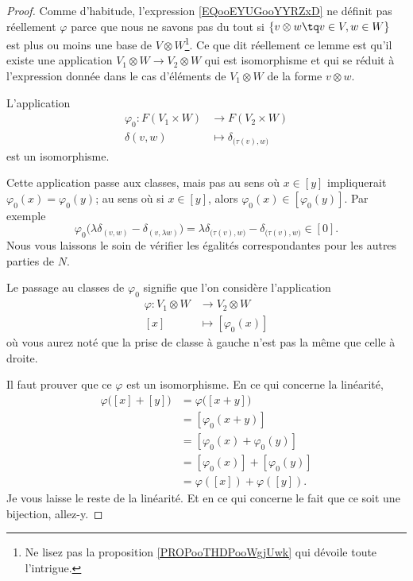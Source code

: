 \begin{proof}
    Comme d'habitude, l'expression \eqref{EQooEYUGooYYRZxD} ne définit pas réellement \( \varphi\) parce que nous ne savons pas du tout si \( \{v\otimes w\tq v\in V,w\in W\}\) est plus ou moins une base de \( V\otimes W\)\footnote{Ne lisez pas la proposition \ref{PROPooTHDPooWgjUwk} qui dévoile toute l'intrigue.}. Ce que dit réellement ce lemme est qu'il existe une application \( V_1\otimes W\to V_2\otimes W\) qui est isomorphisme et qui se réduit à l'expression donnée dans le cas d'éléments de \( V_1\otimes W\) de la forme \( v\otimes w\).

    L'application
    \begin{equation}
        \begin{aligned}
            \varphi_0\colon F(V_1\times W)&\to F(V_2\times W) \\
            \delta{(v,w)}&\mapsto \delta_{\big( \tau(v),w \big)}
        \end{aligned}
    \end{equation}
    est un isomorphisme.

    Cette application passe aux classes, mais pas au sens où \( x\in [y]\) impliquerait \( \varphi_0(x)=\varphi_0(y)\); au sens où si \( x\in [y]\), alors \( \varphi_0(x)\in[\varphi_0(y)]\). Par exemple
    \begin{equation}
        \varphi_0\big( \lambda\delta_{(v,w)}-\delta_{(v,\lambda w)} \big)=\lambda\delta_{\big( \tau(v),w \big)}-\delta_{\big( \tau(v),w \big)}\in [0].
    \end{equation}
    Nous vous laissons le soin de vérifier les égalités correspondantes pour les autres parties de \( N\).

    Le passage au classes de \( \varphi_0\) signifie que l'on considère l'application
    \begin{equation}
        \begin{aligned}
            \varphi\colon V_1\otimes W&\to V_2\otimes W \\
            [x]&\mapsto [\varphi_0(x)] 
        \end{aligned}
    \end{equation}
    où vous aurez noté que la prise de classe à gauche n'est pas la même que celle à droite.

    Il faut prouver que ce \( \varphi\) est un isomorphisme. En ce qui concerne la linéarité,
    \begin{subequations}
        \begin{align}
            \varphi\big( [x]+[y] \big)&=\varphi\big( [x+y] \big)\\
            &=[\varphi_0(x+y)]\\
            &=[\varphi_0(x)+\varphi_0(y)]\\
            &=[\varphi_0(x)]+[\varphi_0(y)]\\
            &=\varphi([x])+\varphi([y]).
        \end{align}
    \end{subequations}
    Je vous laisse le reste de la linéarité. Et en ce qui concerne le fait que ce soit une bijection, allez-y.
\end{proof}

